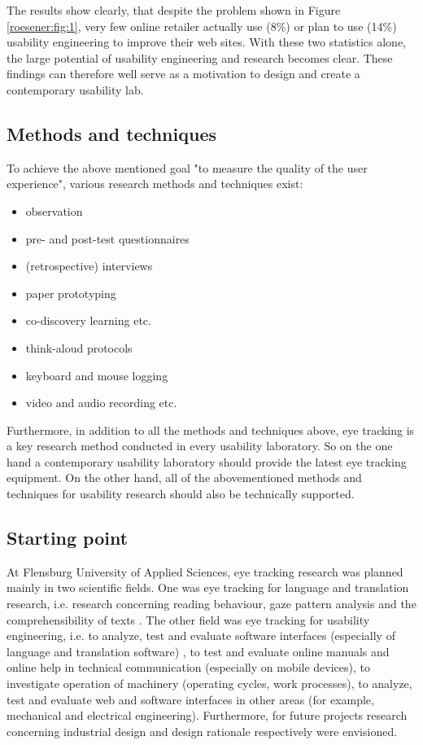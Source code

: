 \documentclass[output=paper]{langsci/langscibook}
\begin{document}
The results show clearly, that despite the problem shown in Figure \ref{roesener:fig:1}, very few online retailer actually use (8\%) or plan to use (14\%) usability engineering to improve their web sites. With these two statistics alone, the large potential of usability engineering and research becomes clear. These findings can therefore well serve as a motivation to design and create a contemporary usability lab.

\subsection{Methods and techniques}

To achieve the above mentioned goal "to measure the quality of the user experience", various research methods and techniques exist:

\begin{itemize}
\item observation
\item pre- and post-test questionnaires 
\item (retrospective) interviews 
\item paper prototyping 
\item co-discovery learning etc.
\item think-aloud protocols 
\item keyboard and mouse logging 
\item video and audio recording etc. 
\end{itemize}

Furthermore, in addition to all the methods and techniques above, eye tracking is a key research method conducted in every usability laboratory. So on the one hand a contemporary usability laboratory should provide the latest eye tracking equipment. On the other hand, all of the abovementioned methods and techniques for usability research should also be technically supported.

\subsection{Starting point}

At Flensburg University of Applied Sciences, eye tracking research was planned mainly in two scientific fields. One was eye tracking for language and translation research, i.e. research concerning reading behaviour, gaze pattern analysis and the comprehensibility of texts \citep{Hennig2007}. The other field was eye tracking for usability engineering, i.e. to analyze, test and evaluate software interfaces (especially of language and translation software) \citep{HansenSchirra2013}, to test and evaluate online manuals and online help in technical communication (especially on mobile devices), to investigate operation of machinery (operating cycles, work processes), to analyze, test and evaluate web and software interfaces in other areas (for example, mechanical and electrical engineering). Furthermore, for future projects research concerning industrial design and design rationale respectively were envisioned.
\end{document}
